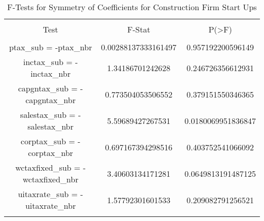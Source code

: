 
\begin{table}[!htbp] \centering 
  \caption{F-Tests for Symmetry of Coefficients for Construction Firm Start Ups} 
  \label{} 
\begin{tabular}{@{\extracolsep{5pt}} ccc} 
\\[-1.8ex]\hline 
\hline \\[-1.8ex] 
Test & F-Stat & P(\textgreater F) \\ 
\hline \\[-1.8ex] 
ptax\_sub = -ptax\_nbr & 0.00288137333161497 & 0.957192200596149 \\ 
inctax\_sub = -inctax\_nbr & 1.34186701242628 & 0.246726356612931 \\ 
capgntax\_sub = -capgntax\_nbr & 0.773504053506552 & 0.379151550346365 \\ 
salestax\_sub = -salestax\_nbr & 5.59689427267531 & 0.0180069951836847 \\ 
corptax\_sub = -corptax\_nbr & 0.697167394298516 & 0.403752541066092 \\ 
wctaxfixed\_sub = -wctaxfixed\_nbr & 3.40603134171281 & 0.0649813191487125 \\ 
uitaxrate\_sub = -uitaxrate\_nbr & 1.57792301601533 & 0.209082791256521 \\ 
\hline \\[-1.8ex] 
\end{tabular} 
\end{table} 
